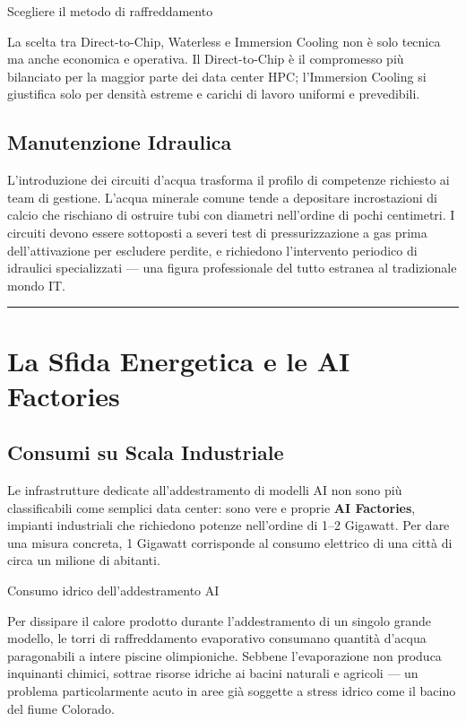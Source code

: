 \documentclass[
  italian,
  openany]{book}
\begin{document}
\begin{callouttip}{Scegliere il metodo di raffreddamento}

La scelta tra Direct-to-Chip, Waterless e Immersion Cooling non è solo
tecnica ma anche economica e operativa. Il Direct-to-Chip è il
compromesso più bilanciato per la maggior parte dei data center HPC;
l'Immersion Cooling si giustifica solo per densità estreme e carichi di
lavoro uniformi e prevedibili.

\end{callouttip}

\subsection{Manutenzione Idraulica}\label{manutenzione-idraulica}

L'introduzione dei circuiti d'acqua trasforma il profilo di competenze
richiesto ai team di gestione. L'acqua minerale comune tende a
depositare incrostazioni di calcio che rischiano di ostruire tubi con
diametri nell'ordine di pochi centimetri. I circuiti devono essere
sottoposti a severi test di pressurizzazione a gas prima
dell'attivazione per escludere perdite, e richiedono l'intervento
periodico di idraulici specializzati --- una figura professionale del
tutto estranea al tradizionale mondo IT.

\begin{center}\rule{0.5\linewidth}{0.5pt}\end{center}

\section{La Sfida Energetica e le AI
Factories}\label{la-sfida-energetica-e-le-ai-factories}

\subsection{Consumi su Scala
Industriale}\label{consumi-su-scala-industriale}

Le infrastrutture dedicate all'addestramento di modelli AI non sono più
classificabili come semplici data center: sono vere e proprie \textbf{AI
Factories}, impianti industriali che richiedono potenze nell'ordine di
1--2 Gigawatt. Per dare una misura concreta, 1 Gigawatt corrisponde al
consumo elettrico di una città di circa un milione di abitanti.

\begin{callouttip}{Consumo idrico dell’addestramento AI}

Per dissipare il calore prodotto durante l'addestramento di un singolo
grande modello, le torri di raffreddamento evaporativo consumano
quantità d'acqua paragonabili a intere piscine olimpioniche. Sebbene
l'evaporazione non produca inquinanti chimici, sottrae risorse idriche
ai bacini naturali e agricoli --- un problema particolarmente acuto in
aree già soggette a stress idrico come il bacino del fiume Colorado.

\end{callouttip}
\end{document}

